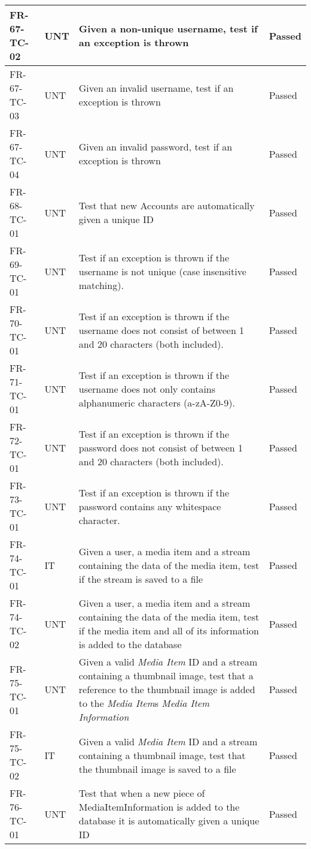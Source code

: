\documentclass[../report.tex]{subfiles}
\begin{document}
\begin{longtable}{|L{2.1cm}|L{1cm}|L{12.4cm}|L{1.4cm}|}
FR-67-TC-02&UNT&Given a non-unique username, test if an exception is thrown&Passed  \\ \hline
FR-67-TC-03&UNT&Given an invalid username, test if an exception is thrown&Passed  \\ \hline
FR-67-TC-04&UNT&Given an invalid password, test if an exception is thrown&Passed  \\ \hline
FR-68-TC-01&UNT&Test that new Accounts are automatically given a unique ID&Passed  \\ \hline
FR-69-TC-01&UNT&Test if an exception is thrown if the username is not unique (case insensitive matching).&Passed  \\ \hline
FR-70-TC-01&UNT&Test if an exception is thrown if the username does not consist of between 1 and 20 characters (both included).&Passed  \\ \hline
FR-71-TC-01&UNT&Test if an exception is thrown if the username does not only contains alphanumeric characters (a-zA-Z0-9).&Passed  \\ \hline
FR-72-TC-01&UNT&Test if an exception is thrown if the password does not consist of between 1 and 20 characters (both included).&Passed  \\ \hline
FR-73-TC-01&UNT&Test if an exception is thrown if the password contains any whitespace character.&Passed  \\ \hline
FR-74-TC-01&IT&Given a user, a media item and a stream containing the data of the media item, test if the stream is saved to a file&Passed  \\ \hline
FR-74-TC-02&UNT&Given a user, a media item and a stream containing the data of the media item, test if the media item and all of its information is added to the database&Passed  \\ \hline
FR-75-TC-01 & UNT & Given a valid \textit{Media Item} ID and a stream containing a thumbnail image, test that a reference to the thumbnail image is added to the \textit{Media Item}s \textit{Media Item Information} & Passed  \\ \hline
FR-75-TC-02 & IT & Given a valid \textit{Media Item} ID and a stream containing a thumbnail image, test that the thumbnail image is saved to a file & Passed  \\ \hline
FR-76-TC-01&UNT&Test that when a new piece of MediaItemInformation is added to the database it is automatically given a unique ID&Passed  \\ \hline

\end{longtable}
\end{document}
